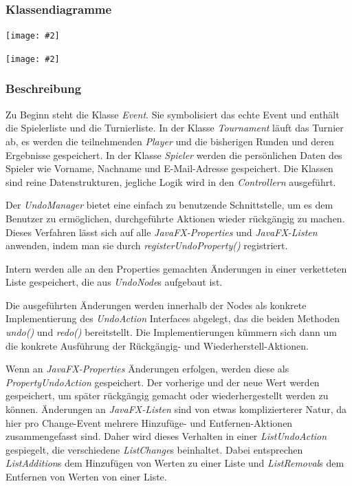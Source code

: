 \documentclass[11pt]{article}
\newcommand{\includediagram}[2]{
	\begin{center}
		\texttt{[image: \#2]}
	\end{center}
}
\begin{document}
\subsubsection{Klassendiagramme}

\includediagram{1.0}{model-main.png}

\includediagram{1.0}{model-undo.png}

\subsubsection{Beschreibung}
Zu Beginn steht die Klasse \textit{Event}. Sie symbolisiert das echte Event und enthält die Spielerliste und die Turnierliste. In der Klasse \textit{Tournament} läuft das Turnier ab, es werden die teilnehmenden \textit{Player} und die bisherigen Runden und deren Ergebnisse gespeichert. In der Klasse \textit{Spieler} werden die persönlichen Daten des Spieler wie Vorname, Nachname und E-Mail-Adresse gespeichert. Die Klassen sind reine Datenstrukturen, jegliche Logik wird in den \textit{Controllern} ausgeführt.

\vspace{0.5cm}

Der \textit{UndoManager} bietet eine einfach zu benutzende Schnittstelle, um es dem Benutzer zu ermöglichen, durchgeführte Aktionen wieder rückgängig zu machen. Dieses Verfahren lässt sich auf alle \textit{JavaFX-Properties} und \textit{JavaFX-Listen} anwenden, indem man sie durch \textit{registerUndoProperty()} registriert.

Intern werden alle an den Properties gemachten Änderungen in einer verketteten Liste gespeichert, die aus \textit{UndoNode}s aufgebaut ist.

Die ausgeführten Änderungen werden innerhalb der Nodes als konkrete Implementierung des \textit{UndoAction} Interfaces abgelegt, das die beiden Methoden \textit{undo()} und \textit{redo()} bereitstellt. Die Implementierungen kümmern sich dann um die konkrete Ausführung der Rückgängig- und Wiederherstell-Aktionen.

\newpage

Wenn an \textit{JavaFX-Properties} Änderungen erfolgen, werden diese als \textit{PropertyUndoAction} gespeichert. Der vorherige und der neue Wert werden gespeichert, um später rückgängig gemacht oder wiederhergestellt werden zu können.
Änderungen an \textit{JavaFX-Listen} sind von etwas komplizierterer Natur, da hier pro Change-Event mehrere Hinzufüge- und Entfernen-Aktionen zusammengefasst sind. Daher wird dieses Verhalten in einer \textit{ListUndoAction} gespiegelt, die verschiedene \textit{ListChange}s beinhaltet. Dabei entsprechen \textit{ListAddition}s dem Hinzufügen von Werten zu einer Liste und \textit{ListRemoval}s dem Entfernen von Werten von einer Liste.
\end{document}
